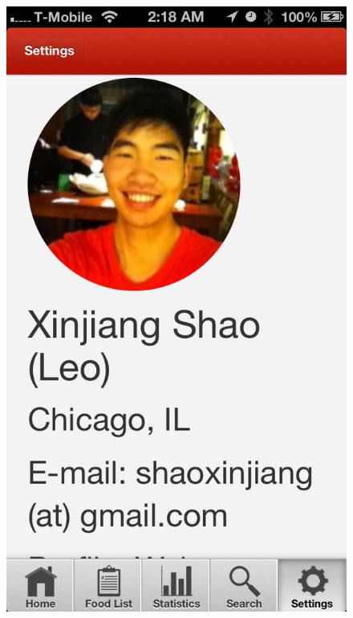 \begin{figure}
{	\includegraphics[width=\figwidth, totalheight=\figheight, keepaspectratio]{./screenshots/settings-author.png}} \hfill
\end{figure}
